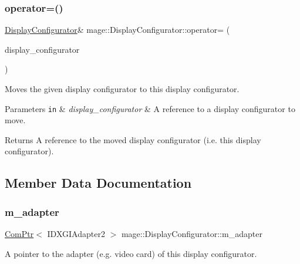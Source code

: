 \subsubsection{\texorpdfstring{operator=()}{operator=()}\hspace{0.1cm}{\footnotesize\ttfamily [2/2]}}
{\footnotesize\ttfamily \hyperlink{classmage_1_1_display_configurator}{Display\+Configurator}\& mage\+::\+Display\+Configurator\+::operator= (\begin{DoxyParamCaption}\item[{\hyperlink{classmage_1_1_display_configurator}{Display\+Configurator} \&\&}]{display\+\_\+configurator }\end{DoxyParamCaption})\hspace{0.3cm}{\ttfamily [delete]}}

Moves the given display configurator to this display configurator.


\begin{DoxyParams}[1]{Parameters}
\mbox{\tt in}  & {\em display\+\_\+configurator} & A reference to a display configurator to move. \\
\hline
\end{DoxyParams}
\begin{DoxyReturn}{Returns}
A reference to the moved display configurator (i.\+e. this display configurator). 
\end{DoxyReturn}


\subsection{Member Data Documentation}
\hypertarget{classmage_1_1_display_configurator_a242f05283f449ba77af3d1d97607a00f}{}\label{classmage_1_1_display_configurator_a242f05283f449ba77af3d1d97607a00f} 
\subsubsection{\texorpdfstring{m\+\_\+adapter}{m\_adapter}}
{\footnotesize\ttfamily \hyperlink{namespacemage_ae74f374780900893caa5555d1031fd79}{Com\+Ptr}$<$ I\+D\+X\+G\+I\+Adapter2 $>$ mage\+::\+Display\+Configurator\+::m\+\_\+adapter\hspace{0.3cm}{\ttfamily [private]}}

A pointer to the adapter (e.\+g. video card) of this display configurator. \hypertarget{classmage_1_1_display_configurator_a5bccdf0eb57db38cf4e933ecf127488d}{}\label{classmage_1_1_display_configurator_a5bccdf0eb57db38cf4e933ecf127488d} 
